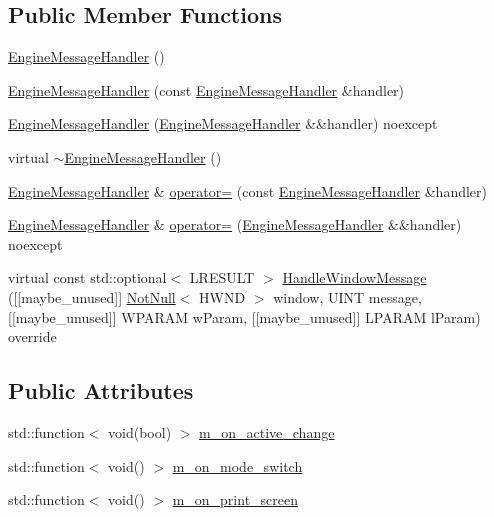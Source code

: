 \subsection*{Public Member Functions}
\begin{DoxyCompactItemize}
\item 
\mbox{\hyperlink{classmage_1_1_engine_message_handler_a1d3e248f3b2b314e5a277a8397f08780}{Engine\+Message\+Handler}} ()
\item 
\mbox{\hyperlink{classmage_1_1_engine_message_handler_a02124b51211515e5bb93b0a1c3250a8c}{Engine\+Message\+Handler}} (const \mbox{\hyperlink{classmage_1_1_engine_message_handler}{Engine\+Message\+Handler}} \&handler)
\item 
\mbox{\hyperlink{classmage_1_1_engine_message_handler_ab771829274e6ab899b4499926f504667}{Engine\+Message\+Handler}} (\mbox{\hyperlink{classmage_1_1_engine_message_handler}{Engine\+Message\+Handler}} \&\&handler) noexcept
\item 
virtual \mbox{\hyperlink{classmage_1_1_engine_message_handler_a458f16ad9f68ad1e908e4d275c383c2c}{$\sim$\+Engine\+Message\+Handler}} ()
\item 
\mbox{\hyperlink{classmage_1_1_engine_message_handler}{Engine\+Message\+Handler}} \& \mbox{\hyperlink{classmage_1_1_engine_message_handler_a567c60f09df9fed3c725ab215e9afbe6}{operator=}} (const \mbox{\hyperlink{classmage_1_1_engine_message_handler}{Engine\+Message\+Handler}} \&handler)
\item 
\mbox{\hyperlink{classmage_1_1_engine_message_handler}{Engine\+Message\+Handler}} \& \mbox{\hyperlink{classmage_1_1_engine_message_handler_a77538e900f5c92e4da88de5042ca5f4c}{operator=}} (\mbox{\hyperlink{classmage_1_1_engine_message_handler}{Engine\+Message\+Handler}} \&\&handler) noexcept
\item 
virtual const std\+::optional$<$ L\+R\+E\+S\+U\+LT $>$ \mbox{\hyperlink{classmage_1_1_engine_message_handler_a3126109746a531e13a2b14b6600ee47e}{Handle\+Window\+Message}} (\mbox{[}\mbox{[}maybe\+\_\+unused\mbox{]}\mbox{]} \mbox{\hyperlink{namespacemage_a8769f9d670d6b585ea306cb1062af94b}{Not\+Null}}$<$ H\+W\+ND $>$ window, U\+I\+NT message, \mbox{[}\mbox{[}maybe\+\_\+unused\mbox{]}\mbox{]} W\+P\+A\+R\+AM w\+Param, \mbox{[}\mbox{[}maybe\+\_\+unused\mbox{]}\mbox{]} L\+P\+A\+R\+AM l\+Param) override
\end{DoxyCompactItemize}
\subsection*{Public Attributes}
\begin{DoxyCompactItemize}
\item 
std\+::function$<$ void(bool) $>$ \mbox{\hyperlink{classmage_1_1_engine_message_handler_a16317d998acb4511b1028b8e6e88027b}{m\+\_\+on\+\_\+active\+\_\+change}}
\item 
std\+::function$<$ void() $>$ \mbox{\hyperlink{classmage_1_1_engine_message_handler_ab1b4379bdda3e37fa2e71e482ae7904a}{m\+\_\+on\+\_\+mode\+\_\+switch}}
\item 
std\+::function$<$ void() $>$ \mbox{\hyperlink{classmage_1_1_engine_message_handler_adbe3af5dfc6ca46e7a41b8261ac82c3f}{m\+\_\+on\+\_\+print\+\_\+screen}}
\end{DoxyCompactItemize}



